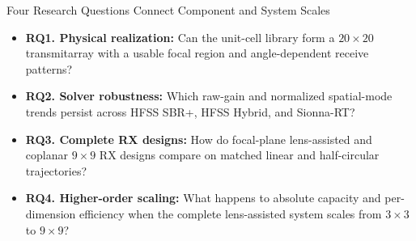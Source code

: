 \begin{frame}[t]{Four Research Questions Connect Component and System Scales}
\footnotesize
\begin{itemize}
  \setlength{\itemsep}{0.45em}
  \item[] \textbf{RQ1. Physical realization:}
        Can the unit-cell library form a $20\times20$ transmitarray with a
        usable focal region and angle-dependent receive patterns?
  \item[] \textbf{RQ2. Solver robustness:}
        Which raw-gain and normalized spatial-mode trends persist across HFSS
        SBR+, HFSS Hybrid, and Sionna-RT?
  \item[] \textbf{RQ3. Complete RX designs:}
        How do focal-plane lens-assisted and coplanar $9\times9$ RX designs
        compare on matched linear and half-circular trajectories?
  \item[] \textbf{RQ4. Higher-order scaling:}
        What happens to absolute capacity and per-dimension efficiency when the
        complete lens-assisted system scales from $3\times3$ to $9\times9$?
\end{itemize}
\end{frame}


